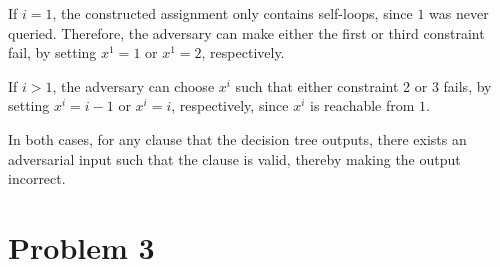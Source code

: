 \documentclass{article}
\begin{document}
If $i = 1$, the constructed assignment only contains self-loops, since $1$ was
never queried. Therefore, the adversary can make either the first or third
constraint fail, by setting $x^1 = 1$ or $x^1 = 2$, respectively.

If $i > 1$, the adversary can choose $x^i$ such that either constraint 2 or
3 fails, by setting $x^i = i - 1$ or $x^i = i$, respectively, since $x^i$ is
reachable from $1$.

In both cases, for any clause that the decision tree outputs, there exists an
adversarial input such that the clause is valid, thereby making the output
incorrect.

\section*{Problem 3}
\end{document}
